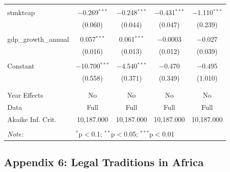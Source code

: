 \documentclass[a4paper,nobind]{templates/ociamthesis}
\begin{document}
\begin{table}[!htbp]
\begin{tabular}{@{\extracolsep{5pt}}lcccc}
  & & & & \\ 
 stmktcap & $-$0.269$^{***}$ & $-$0.248$^{***}$ & $-$0.431$^{***}$ & $-$1.110$^{***}$ \\ 
  & (0.060) & (0.044) & (0.047) & (0.239) \\ 
  & & & & \\ 
 gdp\_growth\_annual & 0.057$^{***}$ & 0.061$^{***}$ & $-$0.0003 & $-$0.027 \\ 
  & (0.016) & (0.013) & (0.012) & (0.039) \\ 
  & & & & \\ 
 Constant & $-$10.700$^{***}$ & $-$4.540$^{***}$ & $-$0.470 & $-$0.495 \\ 
  & (0.558) & (0.371) & (0.349) & (1.010) \\ 
  & & & & \\ 
\hline \\[-1.8ex] 
Year Effects & No & No & No & No \\ 
Data & Full & Full & Full & Full \\ 
Akaike Inf. Crit. & 10,187.000 & 10,187.000 & 10,187.000 & 10,187.000 \\ 
\hline 
\hline \\[-1.8ex] 
\textit{Note:}  & \multicolumn{4}{l}{$^{*}$p$<$0.1; $^{**}$p$<$0.05; $^{***}$p$<$0.01} \\ 
\end{tabular} 
\end{table}

\newpage

\hypertarget{appendix-6-legal-traditions-in-africa}{%
\subsection{Appendix 6: Legal Traditions in Africa}\label{appendix-6-legal-traditions-in-africa}}
\end{document}
